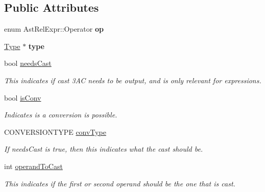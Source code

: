 \subsection*{Public Attributes}
\begin{DoxyCompactItemize}
\item 
\hypertarget{classAstRelExpr_afe819ce358650518a61e053618b09fb8}{enum Ast\-Rel\-Expr\-::\-Operator {\bfseries op}}\label{classAstRelExpr_afe819ce358650518a61e053618b09fb8}

\item 
\hypertarget{classAstRelExpr_a0a6fd7795516dca24c55ada912b826c3}{\hyperlink{classType}{Type} $\ast$ {\bfseries type}}\label{classAstRelExpr_a0a6fd7795516dca24c55ada912b826c3}

\item 
\hypertarget{classAST_aaf215802de409f8096c063d01ffa6783}{bool \hyperlink{classAST_aaf215802de409f8096c063d01ffa6783}{needs\-Cast}}\label{classAST_aaf215802de409f8096c063d01ffa6783}

\begin{DoxyCompactList}\small\item\em This indicates if cast 3\-A\-C needs to be output, and is only relevant for expressions. \end{DoxyCompactList}\item 
\hypertarget{classAST_afa9e77ef650ec6664458fa6cb55be985}{bool \hyperlink{classAST_afa9e77ef650ec6664458fa6cb55be985}{is\-Conv}}\label{classAST_afa9e77ef650ec6664458fa6cb55be985}

\begin{DoxyCompactList}\small\item\em Indicates is a conversion is possible. \end{DoxyCompactList}\item 
\hypertarget{classAST_a61ef3317e023d45237e06615b387cd6b}{C\-O\-N\-V\-E\-R\-S\-I\-O\-N\-T\-Y\-P\-E \hyperlink{classAST_a61ef3317e023d45237e06615b387cd6b}{conv\-Type}}\label{classAST_a61ef3317e023d45237e06615b387cd6b}

\begin{DoxyCompactList}\small\item\em If needs\-Cast is true, then this indicates what the cast should be. \end{DoxyCompactList}\item 
\hypertarget{classAST_aea9b07b39d24183f38c0029cec0a878e}{int \hyperlink{classAST_aea9b07b39d24183f38c0029cec0a878e}{operand\-To\-Cast}}\label{classAST_aea9b07b39d24183f38c0029cec0a878e}

\begin{DoxyCompactList}\small\item\em This indicates if the first or second operand should be the one that is cast. \end{DoxyCompactList}\end{DoxyCompactItemize}
